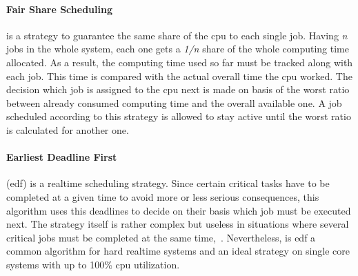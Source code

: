 \paragraph{Fair Share Scheduling}
is a strategy to guarantee the same share of the \ac{cpu} to each single job.
Having \textit{n} jobs in the whole system, each one gets a \textit{1/n} share of the whole computing time allocated.
As a result, the computing time used so far must be tracked along with each job.
This time is compared with the actual overall time the \ac{cpu} worked.
The decision which job is assigned to the \ac{cpu} next is made on basis of the worst ratio between already consumed computing time and the overall available one.
A job scheduled according to this strategy is allowed to stay active until the worst ratio is calculated for another one\cite{mandl2014Grundkurs}.

\paragraph{Earliest Deadline First}
(\ac{edf}) is a realtime scheduling strategy.
Since certain critical tasks have to be completed at a given time to avoid more or less serious consequences, this algorithm uses this deadlines to decide on their basis which job must be executed next.
The strategy itself is rather complex but useless in situations where several critical jobs must be completed at the same time\cite{mandl2014Grundkurs},~\cite{brause2017betriebssysteme}.
Nevertheless, is \ac{edf} a common algorithm for hard realtime systems and an ideal strategy on single core systems with up to 100\% \ac{cpu} utilization\cite{brause2017betriebssysteme}.


